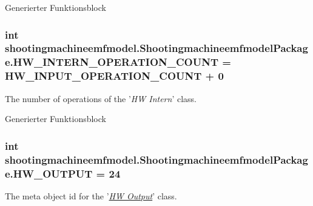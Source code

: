 Generierter Funktionsblock  \hypertarget{interfaceshootingmachineemfmodel_1_1_shootingmachineemfmodel_package_adbbe73334258683c2c965998d0696d81}{
\subsubsection[{H\-W\-\_\-\-I\-N\-T\-E\-R\-N\-\_\-\-O\-P\-E\-R\-A\-T\-I\-O\-N\-\_\-\-C\-O\-U\-N\-T}]{\setlength{\rightskip}{0pt plus 5cm}int shootingmachineemfmodel.\-Shootingmachineemfmodel\-Package.\-H\-W\-\_\-\-I\-N\-T\-E\-R\-N\-\_\-\-O\-P\-E\-R\-A\-T\-I\-O\-N\-\_\-\-C\-O\-U\-N\-T = {\bf H\-W\-\_\-\-I\-N\-P\-U\-T\-\_\-\-O\-P\-E\-R\-A\-T\-I\-O\-N\-\_\-\-C\-O\-U\-N\-T} + 0}}\label{interfaceshootingmachineemfmodel_1_1_shootingmachineemfmodel_package_adbbe73334258683c2c965998d0696d81}
The number of operations of the '{\itshape H\-W Intern}' class.

Generierter Funktionsblock  \hypertarget{interfaceshootingmachineemfmodel_1_1_shootingmachineemfmodel_package_a4bae4f84bd29c449d0339215d739b21b}{
\subsubsection[{H\-W\-\_\-\-O\-U\-T\-P\-U\-T}]{\setlength{\rightskip}{0pt plus 5cm}int shootingmachineemfmodel.\-Shootingmachineemfmodel\-Package.\-H\-W\-\_\-\-O\-U\-T\-P\-U\-T = 24}}\label{interfaceshootingmachineemfmodel_1_1_shootingmachineemfmodel_package_a4bae4f84bd29c449d0339215d739b21b}
The meta object id for the '\hyperlink{classshootingmachineemfmodel_1_1impl_1_1_h_w_output_impl}{{\itshape H\-W Output}}' class.

